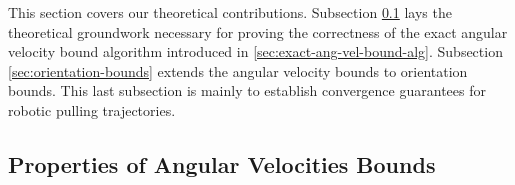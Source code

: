 \documentclass[conference]{IEEEtran}
\newtheorem{proposition}{Proposition}
\newcommand{\EH}[1]{{\color{blue} {Eric: {#1}}  }}
\begin{document}
This section covers our theoretical contributions. Subsection
\ref{sec:prop-angular-velocity-bounds} lays the theoretical groundwork
necessary for proving the correctness of the exact angular velocity
bound algorithm introduced in
\ref{sec:exact-ang-vel-bound-alg}. Subsection
\ref{sec:orientation-bounds} extends the angular velocity bounds to
orientation bounds. This last subsection is mainly to establish
convergence guarantees for robotic pulling trajectories.


\subsection{Properties of Angular Velocities Bounds}\label{sec:prop-angular-velocity-bounds}



\end{document}
